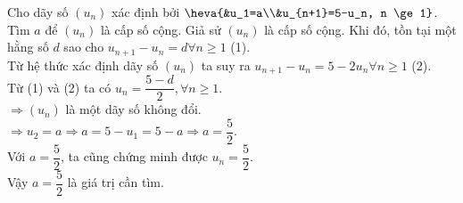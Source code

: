 \begin{ex}%
	Cho dãy số $(u_n)$ xác định bởi $\heva{&u_1=a\\&u_{n+1}=5-u_n, n \ge 1}$. Tìm $a$ để $(u_n)$ là cấp số cộng.
	\loigiai
	{
	Giả sử $(u_n)$ là cấp số cộng. Khi đó, tồn tại một hằng số $d$ sao cho $u_{n+1} -u_n=d \forall n \ge 1$ \quad (1). \\
	Từ hệ thức xác định dãy số $(u_n)$ ta suy ra $u_{n+1} -u_n= 5 - 2 u_n \forall n \ge 1$ \quad (2). \\
	Từ (1) và (2) ta có $u_n = \dfrac{5-d}{2}, \forall n \ge 1$.\\
	$\Rightarrow (u_n)$ là một dãy số không đổi.\\
	$\Rightarrow u_2 =a \Rightarrow a=5-u_1=5-a \Rightarrow a= \dfrac{5}{2}$.\\
	Với $a= \dfrac{5}{2}$, ta cũng chứng minh được $u_n= \dfrac{5}{2}$.\\
	Vậy $a= \dfrac{5}{2}$ là giá trị cần tìm.
	}
\end{ex}


